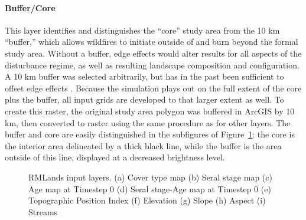 \paragraph*{Buffer/Core} 
This layer identifies and distinguishes the ``core'' study area from the 10 km ``buffer,'' which allows wildfires to initiate outside of and burn beyond the formal study area. Without a buffer, edge effects would alter results for all aspects of the disturbance regime, as well as resulting landscape composition and configuration. A 10 km buffer was selected arbitrarily, but has in the past been sufficient to offset edge effects \citep{McGarigal2005,McGarigal2005a}. Because the simulation plays out on the full extent of the core plus the buffer, all input grids are developed to that larger extent as well. To create this raster, the original study area polygon was buffered in ArcGIS by 10 km, then converted to raster using the same procedure as for other layers. The buffer and core are easily distinguished in the subfigures of Figure~\ref{fig:inputlayermaps}: the core is the interior area delineated by a thick black line, while the buffer is the area outside of this line, displayed at a decreased brightness level.


\begin{figure}[!htbp]
  \centering
   \qquad
	 \qquad
   \qquad
	 \qquad

  \caption{RMLands input layers. (a) Cover type map (b) Seral stage map (c) Age map at Timestep 0 (d) Seral stage-Age map at Timestep 0 (e) Topographic Position Index (f) Elevation (g) Slope (h) Aspect (i) Streams}
  \label{fig:inputlayermaps}
\end{figure}


